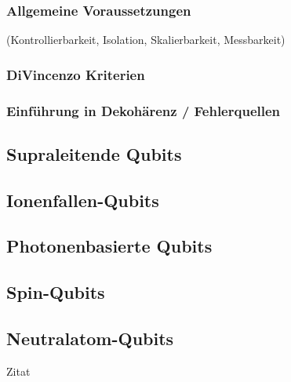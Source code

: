 \subsubsection{Allgemeine Voraussetzungen}
(Kontrollierbarkeit, Isolation, Skalierbarkeit, Messbarkeit) 
\subsubsection{DiVincenzo Kriterien}
\subsubsection{Einführung in Dekohärenz / Fehlerquellen}
\subsection{Supraleitende Qubits }
\subsection{Ionenfallen-Qubits }
\subsection{Photonenbasierte Qubits}
\subsection{Spin-Qubits}
\subsection{Neutralatom-Qubits }

 

Zitat \cite{alhazmi_live_2024}

\printbibliography
